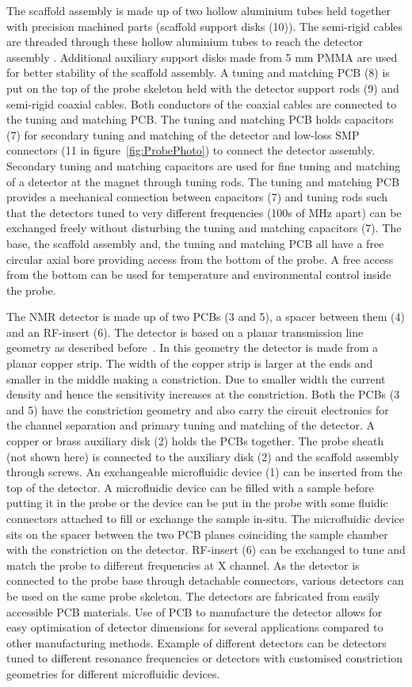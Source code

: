 \documentclass[preprint,12pt]{article}
\begin{document}
The scaffold assembly is made up of two hollow aluminium tubes held together with precision machined parts (scaffold support disks (10)). The semi-rigid cables are threaded through these hollow aluminium tubes to reach the detector assembly . Additional auxiliary support disks made from 5 mm PMMA are used for better stability of the scaffold assembly. A tuning and matching PCB (8) is put on the top of the probe skeleton held with the detector support rods (9) and semi-rigid coaxial cables. Both conductors of the coaxial cables are connected to the tuning and matching PCB. The tuning and matching PCB holds capacitors (7) for secondary tuning and matching of the detector and low-loss SMP connectors (11 in figure~\ref{fig:ProbePhoto}) to connect the detector assembly. Secondary tuning and matching capacitors are used for fine tuning and matching of a detector at the magnet through tuning rods. The tuning and matching PCB provides a mechanical connection between capacitors (7) and tuning rods such that the detectors tuned to very different frequencies (100s of MHz apart) can be exchanged freely without disturbing the tuning and matching capacitors (7). The base, the scaffold assembly and, the tuning and matching PCB all have a free circular axial bore providing access from the bottom of the probe. A free access from the bottom can be used for temperature and environmental control inside the probe.\par
The NMR detector is made up of two PCBs (3 and 5), a spacer between them (4) and an RF-insert (6). The detector is based on a planar transmission line geometry as described before~\cite{gream_2016,stripline_jan}. In this geometry the detector is made from a planar copper strip. The width of the copper strip is larger at the ends and smaller in the middle making a constriction. Due to smaller width the current density and hence the sensitivity increases at the constriction. Both the PCBs (3 and 5) have the constriction geometry  and also carry the circuit electronics for the channel separation and primary tuning and matching of the detector. A copper or brass auxiliary disk (2) holds the PCBs together. The probe sheath (not shown here) is connected to the auxiliary disk (2) and the scaffold assembly through screws. An exchangeable microfluidic device (1) can be inserted from the top of the detector. A microfluidic device can be filled with a sample before putting it in the probe or the device can be put in the probe with some fluidic connectors attached to fill or exchange the sample in-situ. The microfluidic device sits on the spacer between the two PCB planes coinciding the sample chamber with the constriction on the detector.  RF-insert (6) can be exchanged to tune and match the probe to different frequencies at X channel. As the detector is connected to the probe base through detachable connectors, various detectors can be used on the same probe skeleton. The detectors are fabricated from easily accessible PCB materials. Use of PCB to manufacture the detector allows for easy optimisation of detector dimensions for several applications compared to other manufacturing methods. Example of different detectors can be detectors tuned to different resonance frequencies or detectors with customised constriction geometries for different microfluidic devices.\par
\end{document}
